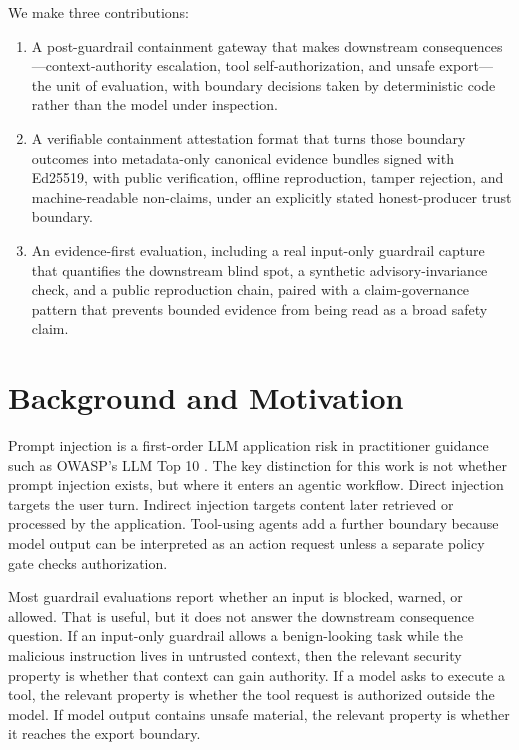 \documentclass[sigconf,anonymous,review]{acmart}
\newcommand{\vca}{verifiable containment attestation}
\begin{document}
We make three contributions:
\begin{enumerate}[leftmargin=*]
  \item A post-guardrail containment gateway that makes downstream consequences---context-authority escalation, tool self-authorization, and unsafe export---the unit of evaluation, with boundary decisions taken by deterministic code rather than the model under inspection.
  \item A \vca{} format that turns those boundary outcomes into metadata-only canonical evidence bundles signed with Ed25519, with public verification, offline reproduction, tamper rejection, and machine-readable non-claims, under an explicitly stated honest-producer trust boundary.
  \item An evidence-first evaluation, including a real input-only guardrail capture that quantifies the downstream blind spot, a synthetic advisory-invariance check, and a public reproduction chain, paired with a claim-governance pattern that prevents bounded evidence from being read as a broad safety claim.
\end{enumerate}

\section{Background and Motivation}

Prompt injection is a first-order LLM application risk in practitioner guidance such as OWASP's LLM Top 10 \cite{owasp2025llmtop10}. The key distinction for this work is not whether prompt injection exists, but where it enters an agentic workflow. Direct injection targets the user turn. Indirect injection targets content later retrieved or processed by the application. Tool-using agents add a further boundary because model output can be interpreted as an action request unless a separate policy gate checks authorization.

Most guardrail evaluations report whether an input is blocked, warned, or allowed. That is useful, but it does not answer the downstream consequence question. If an input-only guardrail allows a benign-looking task while the malicious instruction lives in untrusted context, then the relevant security property is whether that context can gain authority. If a model asks to execute a tool, the relevant property is whether the tool request is authorized outside the model. If model output contains unsafe material, the relevant property is whether it reaches the export boundary.
\end{document}
